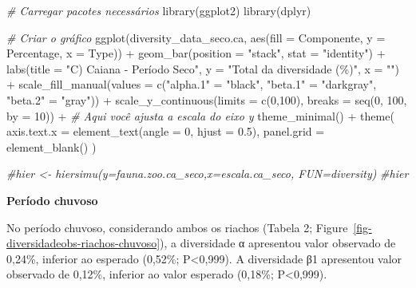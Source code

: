 \documentclass[
  letterpaper,
  DIV=11,
  numbers=noendperiod]{scrartcl}
\newenvironment{Shaded}{}{}
\newcommand{\AttributeTok}[1]{\textcolor[rgb]{0.49,0.56,0.16}{#1}}
\newcommand{\CommentTok}[1]{\textcolor[rgb]{0.38,0.63,0.69}{\textit{#1}}}
\newcommand{\DecValTok}[1]{\textcolor[rgb]{0.25,0.63,0.44}{#1}}
\newcommand{\FloatTok}[1]{\textcolor[rgb]{0.25,0.63,0.44}{#1}}
\newcommand{\FunctionTok}[1]{\textcolor[rgb]{0.02,0.16,0.49}{#1}}
\newcommand{\NormalTok}[1]{#1}
\newcommand{\OtherTok}[1]{\textcolor[rgb]{0.00,0.44,0.13}{#1}}
\newcommand{\SpecialCharTok}[1]{\textcolor[rgb]{0.25,0.44,0.63}{#1}}
\newcommand{\StringTok}[1]{\textcolor[rgb]{0.25,0.44,0.63}{#1}}
\begin{document}
\begin{Shaded}
\begin{Highlighting}[numbers=left,,]
\CommentTok{\# Carregar pacotes necessários}
\FunctionTok{library}\NormalTok{(ggplot2)}
\FunctionTok{library}\NormalTok{(dplyr)}

\CommentTok{\# Criar o gráfico}
\FunctionTok{ggplot}\NormalTok{(diversity\_data\_seco.ca, }\FunctionTok{aes}\NormalTok{(}\AttributeTok{fill =}\NormalTok{ Componente, }\AttributeTok{y =}\NormalTok{ Percentage, }\AttributeTok{x =}\NormalTok{ Type)) }\SpecialCharTok{+}
  \FunctionTok{geom\_bar}\NormalTok{(}\AttributeTok{position =} \StringTok{"stack"}\NormalTok{, }\AttributeTok{stat =} \StringTok{"identity"}\NormalTok{) }\SpecialCharTok{+}
  \FunctionTok{labs}\NormalTok{(}\AttributeTok{title =} \StringTok{"C) Caiana {-} Período Seco"}\NormalTok{,}
       \AttributeTok{y =} \StringTok{"Total da diversidade (\%)"}\NormalTok{,}
       \AttributeTok{x =} \StringTok{""}\NormalTok{) }\SpecialCharTok{+}
  \FunctionTok{scale\_fill\_manual}\NormalTok{(}\AttributeTok{values =} \FunctionTok{c}\NormalTok{(}\StringTok{"alpha.1"} \OtherTok{=} \StringTok{"black"}\NormalTok{,}
                               \StringTok{"beta.1"} \OtherTok{=} \StringTok{"darkgray"}\NormalTok{,}
                               \StringTok{"beta.2"} \OtherTok{=} \StringTok{"gray"}\NormalTok{)) }\SpecialCharTok{+}
  \FunctionTok{scale\_y\_continuous}\NormalTok{(}\AttributeTok{limits =} \FunctionTok{c}\NormalTok{(}\DecValTok{0}\NormalTok{,}\DecValTok{100}\NormalTok{), }\AttributeTok{breaks =} \FunctionTok{seq}\NormalTok{(}\DecValTok{0}\NormalTok{, }\DecValTok{100}\NormalTok{, }\AttributeTok{by =} \DecValTok{10}\NormalTok{)) }\SpecialCharTok{+} \CommentTok{\# Aqui você ajusta a escala do eixo y}
  \FunctionTok{theme\_minimal}\NormalTok{() }\SpecialCharTok{+}
  \FunctionTok{theme}\NormalTok{(}
    \AttributeTok{axis.text.x =} \FunctionTok{element\_text}\NormalTok{(}\AttributeTok{angle =} \DecValTok{0}\NormalTok{, }\AttributeTok{hjust =} \FloatTok{0.5}\NormalTok{),}
    \AttributeTok{panel.grid =} \FunctionTok{element\_blank}\NormalTok{()}
\NormalTok{  )}

\CommentTok{\#hier \textless{}{-} hiersimu(y=fauna.zoo.ca\_seco,x=escala.ca\_seco, FUN=diversity)}
\CommentTok{\#hier}
\end{Highlighting}
\end{Shaded}

\textbf{Período chuvoso}

No período chuvoso, considerando ambos os riachos (Tabela 2;
Figure~\ref{fig-diversidadeobs-riachos-chuvoso}), a diversidade α
apresentou valor observado de 0,24\%, inferior ao esperado (0,52\%;
P\textless0,999). A diversidade β1 apresentou valor observado de 0,12\%,
inferior ao valor esperado (0,18\%; P\textless0,999).
\end{document}
